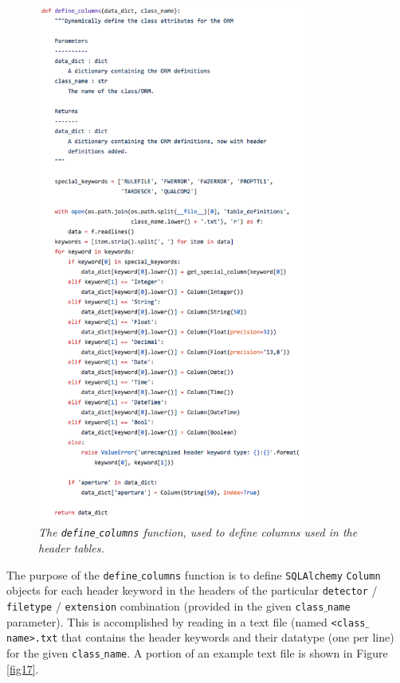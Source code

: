 \documentclass[10pt,journal,compsoc]{IEEEtran}
\begin{document}
\begin{figure}[!h]
\centering
\includegraphics[width=3.5in]{./figures/define_columns.png}
\caption{\textit{The \texttt{define$\_$columns} function, used to define columns used in the header tables.}}
\label{fig16}
\end{figure}

The purpose of the \texttt{define$\_$columns} function is to define \texttt{SQLAlchemy} \texttt{Column} objects for each header keyword in the headers of the particular
\texttt{detector} / \texttt{filetype} / \texttt{extension} combination (provided in the given \texttt{class$\_$name} parameter).  This is accomplished by reading in a text file
(named \texttt{<class$\_$name>.txt} that contains the header keywords and their datatype (one per line) for the given \texttt{class$\_$name}. A portion of an example text file
is shown in Figure \ref{fig17}.
\end{document}
